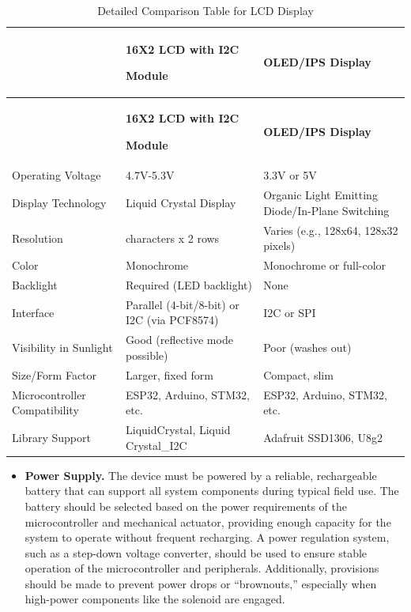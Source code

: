 \begin{thesisprose}
\FloatBarrier
\begingroup
\small
\setlength{\tabcolsep}{3pt}
\renewcommand{\arraystretch}{1.14}
\setlength{\arrayrulewidth}{1pt}
\begin{longtable}{|>{\raggedright\arraybackslash}p{}|>{\raggedright\arraybackslash}p{}|>{\raggedright\arraybackslash}p{}|}
\caption{Detailed Comparison Table for LCD Display}\label{tab:detailed-comparison-table-for-lcd-display-296}\\
\hline
{\bfseries \textbf{Features}} & {\bfseries \textbf{16X2 LCD with I2C}\par \textbf{Module}} & {\bfseries \textbf{OLED/\allowbreak{}IPS Display}} \\
\hline
\endfirsthead
\hline
{\bfseries \textbf{Features}} & {\bfseries \textbf{16X2 LCD with I2C}\par \textbf{Module}} & {\bfseries \textbf{OLED/\allowbreak{}IPS Display}} \\
\hline
\endhead
Operating Voltage & 4.7V-5.3V & 3.3V or 5V \\
\hline
Display Technology & Liquid Crystal Display & Organic Light Emitting Diode/\allowbreak{}In-Plane Switching \\
\hline
Resolution & 16 characters x 2 rows & Varies (e.g., 128x64, 128x32 pixels) \\
\hline
Color & Monochrome & Monochrome or full-color \\
\hline
Backlight & Required (LED backlight) & None \\
\hline
Interface & Parallel (4-bit/\allowbreak{}8-bit) or I2C (via PCF8574) & I2C or SPI \\
\hline
Visibility in Sunlight & Good (reflective mode possible) & Poor (washes out) \\
\hline
Size/\allowbreak{}Form Factor & Larger, fixed form & Compact, slim \\
\hline
Microcontroller Compatibility & ESP32, Arduino, STM32, etc. & ESP32, Arduino, STM32, etc. \\
\hline
Library Support & LiquidCrystal, Liquid Crystal\_\allowbreak{}I2C & Adafruit SSD1306, U8g2 \\
\hline
\end{longtable}
\endgroup

\begin{itemize}

\item \textbf{Power Supply.} The device must be powered by a reliable, rechargeable battery that can support all system components during typical field use. The battery should be selected based on the power requirements of the microcontroller and mechanical actuator, providing enough capacity for the system to operate without frequent recharging. A power regulation system, such as a step-down voltage converter, should be used to ensure stable operation of the microcontroller and peripherals. Additionally, provisions should be made to prevent power drops or “brownouts,” especially when high-power components like the solenoid are engaged.


\end{itemize}
\end{thesisprose}
